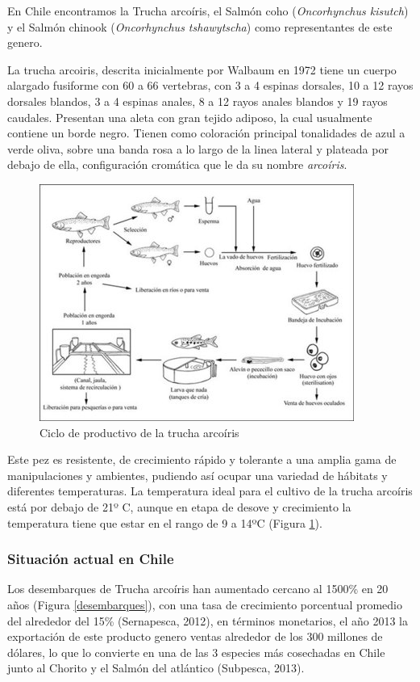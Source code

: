 \documentclass[11pt,a4paper,]{article}
\begin{document}
En Chile encontramos la Trucha arcoíris, el Salmón coho
(\emph{Oncorhynchus kisutch}) y el Salmón chinook (\emph{Oncorhynchus
tshawytscha}) como representantes de este genero.

La trucha arcoiris, descrita inicialmente por Walbaum en 1972 tiene un
cuerpo alargado fusiforme con 60 a 66 vertebras, con 3 a 4 espinas
dorsales, 10 a 12 rayos dorsales blandos, 3 a 4 espinas anales, 8 a 12
rayos anales blandos y 19 rayos caudales. Presentan una aleta con gran
tejido adiposo, la cual usualmente contiene un borde negro. Tienen como
coloración principal tonalidades de azul a verde oliva, sobre una banda
rosa a lo largo de la linea lateral y plateada por debajo de ella,
configuración cromática que le da su nombre \emph{arcoíris}.

\begin{figure}[htbp]
\centering
\includegraphics{gfx/1.jpg}
\caption{Ciclo de productivo de la trucha arcoíris \label{ciclo}}
\end{figure}

Este pez es resistente, de crecimiento rápido y tolerante a una amplia
gama de manipulaciones y ambientes, pudiendo así ocupar una variedad de
hábitats y diferentes temperaturas. La temperatura ideal para el cultivo
de la trucha arcoíris está por debajo de 21º C, aunque en etapa de
desove y crecimiento la temperatura tiene que estar en el rango de 9 a
14ºC (Figura \ref{ciclo}).

\subsubsection{Situación actual en
Chile}\label{situaciuxf3n-actual-en-chile}

Los desembarques de Trucha arcoíris han aumentado cercano al 1500\% en
20 años (Figura \ref{desembarques}), con una tasa de crecimiento
porcentual promedio del alrededor del 15\% (Sernapesca, 2012), en
términos monetarios, el año 2013 la exportación de este producto genero
ventas alrededor de los 300 millones de dólares, lo que lo convierte en
una de las 3 especies más cosechadas en Chile junto al Chorito y el
Salmón del atlántico (Subpesca, 2013).
\end{document}
